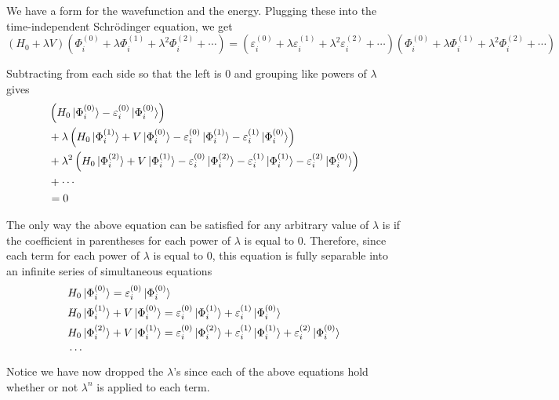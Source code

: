 \documentclass{article}
\newcommand{\eps}{\varepsilon}
\newcommand{\lam}{\lambda}
\begin{document}
We have a form for the wavefunction and the energy. Plugging these 
into the time-independent Schr{\"o}dinger equation, we get 
\[
(H_0 + \lam V) (\Phi_i^{(0)} +  \lam \Phi_i^{(1)} + \lam^2 \Phi_i^{(2)} + \cdots)
=  (\eps_i^{(0)} +  \lam \eps_i^{(1)} + \lam^2 \eps_i^{(2)}  + \cdots ) (\Phi_i^{(0)} +  \lam \Phi_i^{(1)} + \lam^2 \Phi_i^{(2)} + \cdots)
 \]

Subtracting from each side so that the left is 0 and grouping like powers of $\lam$ gives
\begin{align*}
&  \left(H_0 \ket{\Phi_i^{(0)}} - \eps_i^{(0)} \ket{\Phi_i^{(0)}}   \right) \\
&+ \lam \left( H_0\ket{\Phi_i^{(1)}} + V\ket{\Phi_i^{(0)}} - \eps_i^{(0)}\ket{\Phi_i^{(1)}} - \eps_i^{(1)}\ket{\Phi_i^{(0)}} \right)  \\
&+ \lam^2 \left( H_0 \ket{\Phi_i^{(2)}} + V \ket{\Phi_i^{(1)}} - \eps_i^{(0)} \ket{\Phi_i^{(2)}} - \eps_i^{(1)} \ket{\Phi_i^{(1)}} - \eps_i^{(2)} \ket{\Phi_i^{(0)}}  \right)  \\
&+ \cdots \\ 
&= 0
\end{align*}

The only way the above equation can be satisfied for any arbitrary value of $\lam$ is 
    if the coefficient in parentheses for each power of $\lam$ is equal to 0.
Therefore, since each term for each power of $\lam$ is equal to 0,
    this equation is fully separable into an infinite series of simultaneous equations
\begin{align*}
&  H_0 \ket{\Phi_i^{(0)}} = \eps_i^{(0)} \ket{\Phi_i^{(0)}}   \\
&  H_0\ket{\Phi_i^{(1)}} + V\ket{\Phi_i^{(0)}} = \eps_i^{(0)}\ket{\Phi_i^{(1)}} + \eps_i^{(1)}\ket{\Phi_i^{(0)}}  \\
&  H_0 \ket{\Phi_i^{(2)}} + V \ket{\Phi_i^{(1)}} = \eps_i^{(0)} \ket{\Phi_i^{(2)}} + \eps_i^{(1)} \ket{\Phi_i^{(1)}} + \eps_i^{(2)} \ket{\Phi_i^{(0)}}  \\
& \cdots \\ 
\end{align*}
Notice we have now dropped the $\lam$'s since each of the above equations hold whether or not $\lam^n$ is applied to each term.








 
\end{document}
